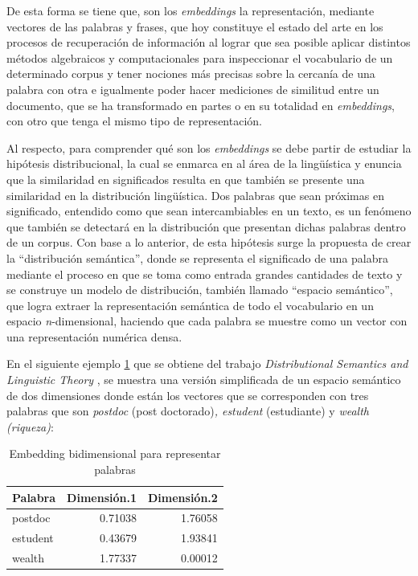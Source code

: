\documentclass[
  12pt,
  openany]{book}
\begin{document}
De esta forma se tiene que, son los \emph{embeddings} la representación, mediante vectores de las palabras y frases, que hoy constituye el estado del arte en los procesos de recuperación de información al lograr que sea posible aplicar distintos métodos algebraicos y computacionales para inspeccionar el vocabulario de un determinado corpus y tener nociones más precisas sobre la cercanía de una palabra con otra e igualmente poder hacer mediciones de similitud entre un documento, que se ha transformado en partes o en su totalidad en \emph{embeddings}, con otro que tenga el mismo tipo de representación.~

Al respecto, para comprender qué son los \emph{embeddings} se debe partir de estudiar la hipótesis distribucional, la cual se enmarca en al área de la lingüística y enuncia que la similaridad en significados resulta en que también se presente una similaridad en la distribución lingüística. Dos palabras que sean próximas en significado, entendido como que sean intercambiables en un texto, es un fenómeno que también se detectará en la distribución que presentan dichas palabras dentro de un corpus. Con base a lo anterior, de esta hipótesis surge la propuesta de crear la ``distribución semántica'', donde se representa el significado de una palabra mediante el proceso en que se toma como entrada grandes cantidades de texto y se construye un modelo de distribución, también llamado ``espacio semántico'', que logra extraer la representación semántica de todo el vocabulario en un espacio \emph{n}-dimensional, haciendo que cada palabra se muestre como un vector con una representación numérica densa.

En el siguiente ejemplo \ref{tab:tblembedding} que se obtiene del trabajo \emph{Distributional Semantics and Linguistic Theory} \citep{boleda2020}, se muestra una versión simplificada de un espacio semántico de dos dimensiones donde están los vectores que se corresponden con tres palabras que son \emph{postdoc} (post doctorado)\emph{, estudent} (estudiante) y \emph{wealth (riqueza)}:

\begin{table}

\caption{\label{tab:tblembedding}Embedding bidimensional para representar palabras}
\centering
\begin{tabular}[t]{lrr}
\toprule
Palabra & Dimensión.1 & Dimensión.2\\
\midrule
postdoc & 0.71038 & 1.76058\\
estudent & 0.43679 & 1.93841\\
wealth & 1.77337 & 0.00012\\
\bottomrule
\end{tabular}
\end{table}
\end{document}
